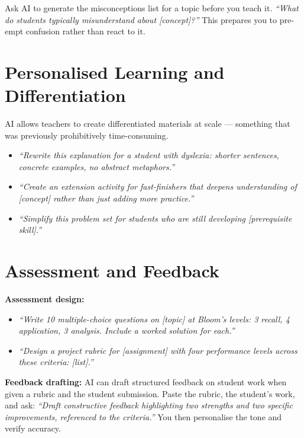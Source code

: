 \begin{tipbox}
Ask AI to generate the misconceptions list for a topic before you teach it.
\textit{``What do students typically misunderstand about [concept]?''}
This prepares you to pre-empt confusion rather than react to it.
\end{tipbox}

\section{Personalised Learning and Differentiation}
\label{sec:personalisation}

AI allows teachers to create differentiated materials at scale --- something that was
previously prohibitively time-consuming.

\begin{itemize}
  \item \textit{``Rewrite this explanation for a student with dyslexia: shorter sentences, concrete examples, no abstract metaphors.''}
  \item \textit{``Create an extension activity for fast-finishers that deepens understanding of [concept] rather than just adding more practice.''}
  \item \textit{``Simplify this problem set for students who are still developing [prerequisite skill].''}
\end{itemize}

\section{Assessment and Feedback}
\label{sec:assessment}

\textbf{Assessment design:}
\begin{itemize}
  \item \textit{``Write 10 multiple-choice questions on [topic] at Bloom's levels: 3 recall, 4 application, 3 analysis. Include a worked solution for each.''}
  \item \textit{``Design a project rubric for [assignment] with four performance levels across these criteria: [list].''}
\end{itemize}

\textbf{Feedback drafting:}
AI can draft structured feedback on student work when given a rubric and the student
submission.
Paste the rubric, the student's work, and ask:
\textit{``Draft constructive feedback highlighting two strengths and two specific
improvements, referenced to the criteria.''}
You then personalise the tone and verify accuracy.


